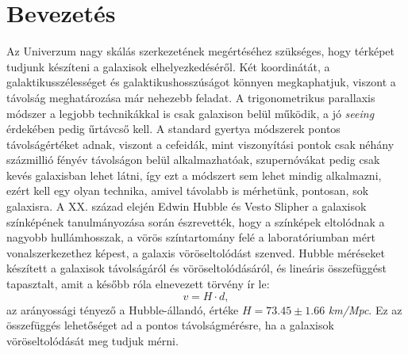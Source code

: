 \documentclass[12pt,letterpaper,oneside,openright]{book}
\begin{document}
\chapter{Bevezetés}
Az Univerzum nagy skálás szerkezetének megértéséhez szükséges, hogy térképet tudjunk készíteni a galaxisok elhelyezkedéséről. Két koordinátát, a galaktikusszélességet és galaktikushosszúságot könnyen megkaphatjuk, viszont a  távolság meghatározása már nehezebb feladat. A  trigonometrikus parallaxis módszer a legjobb technikákkal is csak galaxison belül működik, a jó \textit{seeing} érdekében pedig űrtávcső kell.  A standard gyertya módszerek pontos távolságértéket adnak, viszont a cefeidák, mint viszonyítási pontok csak néhány százmillió fényév távolságon belül alkalmazhatóak, szupernóvákat pedig csak kevés galaxisban lehet látni, így ezt a módszert sem lehet mindig alkalmazni, ezért kell egy olyan technika, amivel távolabb is mérhetünk, pontosan, sok galaxisra. 
\newline \indent
A XX. század elején Edwin Hubble és Vesto Slipher a galaxisok színképének tanulmányozása során észrevették, hogy a színképek eltolódnak a nagyobb hullámhosszak, a vörös színtartomány felé a laboratóriumban mért vonalszerkezethez képest, a galaxis vöröseltolódást szenved. Hubble méréseket készített a galaxisok távolságáról és vöröseltolódásáról, és lineáris összefüggést tapasztalt, amit a később róla elnevezett törvény ír le:
\begin{equation}
v = H\cdot d,
\end{equation}
az arányossági tényező a Hubble-állandó, értéke $ H = 73.45\pm1.66$ \textit{km/Mpc}. Ez az összefüggés lehetőséget ad  a pontos távolságmérésre, ha  a galaxisok vöröseltolódását meg tudjuk mérni. 
\newline \indent
\end{document}
